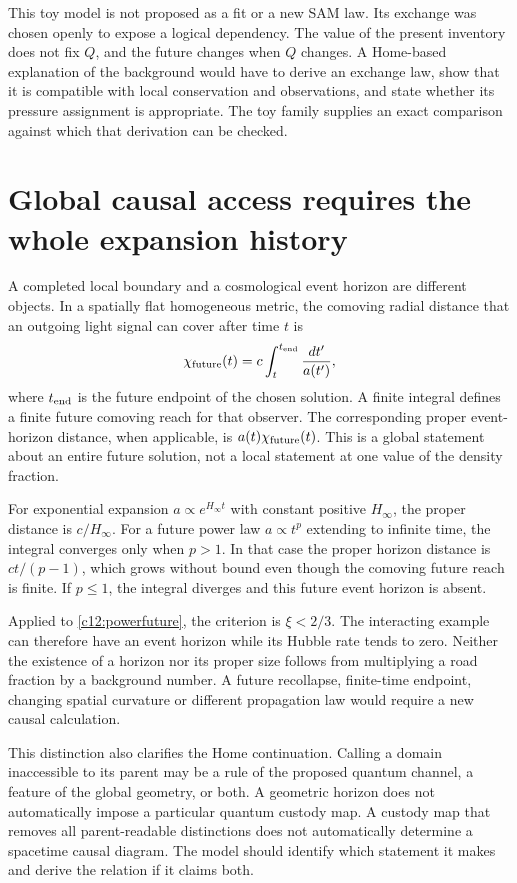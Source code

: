 This toy model is not proposed as a fit or a new SAM law. Its exchange was chosen openly to expose a logical dependency. The value of the present inventory does not fix $Q$, and the future changes when $Q$ changes. A Home-based explanation of the background would have to derive an exchange law, show that it is compatible with local conservation and observations, and state whether its pressure assignment is appropriate. The toy family supplies an exact comparison against which that derivation can be checked.

\section{Global causal access requires the whole expansion history}
A completed local boundary and a cosmological event horizon are different objects. In a spatially flat homogeneous metric, the comoving radial distance that an outgoing light signal can cover after time $t$ is
\begin{equation}
 \chi_{\rm future}(t)=c\int_t^{t_{\rm end}}\frac{dt'}{a(t')},
 \label{c12:eventintegral}
\end{equation}
where $t_{\rm end}$ is the future endpoint of the chosen solution. A finite integral defines a finite future comoving reach for that observer. The corresponding proper event-horizon distance, when applicable, is $a(t)\chi_{\rm future}(t)$. This is a global statement about an entire future solution, not a local statement at one value of the density fraction.

For exponential expansion $a\propto e^{H_\infty t}$ with constant positive $H_\infty$, the proper distance is $c/H_\infty$. For a future power law $a\propto t^p$ extending to infinite time, the integral converges only when $p>1$. In that case the proper horizon distance is $ct/(p-1)$, which grows without bound even though the comoving future reach is finite. If $p\leq1$, the integral diverges and this future event horizon is absent.

Applied to \eqref{c12:powerfuture}, the criterion is $\xi<2/3$. The interacting example can therefore have an event horizon while its Hubble rate tends to zero. Neither the existence of a horizon nor its proper size follows from multiplying a road fraction by a background number. A future recollapse, finite-time endpoint, changing spatial curvature or different propagation law would require a new causal calculation.

This distinction also clarifies the Home continuation. Calling a domain inaccessible to its parent may be a rule of the proposed quantum channel, a feature of the global geometry, or both. A geometric horizon does not automatically impose a particular quantum custody map. A custody map that removes all parent-readable distinctions does not automatically determine a spacetime causal diagram. The model should identify which statement it makes and derive the relation if it claims both.

